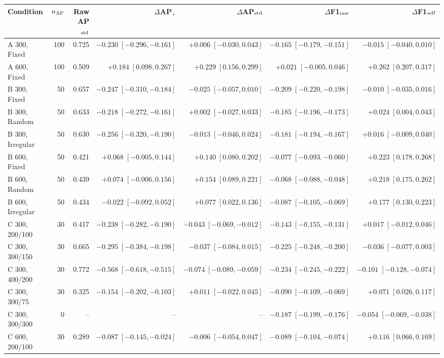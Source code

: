\begin{tabular}{lrrrrrr}
\toprule
Condition & $n_{\rm AP}$ & Raw AP$_{\rm std}$ & $\Delta$AP$_+$ & $\Delta$AP$_{\rm std}$ & $\Delta$F1$_{\rm raw}$ & $\Delta$F1$_{\rm self}$ \\
\midrule
A 300, Fixed & 100 & 0.725 & $-0.230\;[-0.296,-0.161]$ & $+0.006\;[-0.030,0.043]$ & $-0.165\;[-0.179,-0.151]$ & $-0.015\;[-0.040,0.010]$ \\
A 600, Fixed & 100 & 0.509 & $+0.184\;[0.098,0.267]$ & $+0.229\;[0.156,0.299]$ & $+0.021\;[-0.005,0.046]$ & $+0.262\;[0.207,0.317]$ \\
B 300, Fixed & 50 & 0.657 & $-0.247\;[-0.310,-0.184]$ & $-0.025\;[-0.057,0.010]$ & $-0.209\;[-0.220,-0.198]$ & $-0.010\;[-0.035,0.016]$ \\
B 300, Random & 50 & 0.633 & $-0.218\;[-0.272,-0.161]$ & $+0.002\;[-0.027,0.033]$ & $-0.185\;[-0.196,-0.173]$ & $+0.024\;[0.004,0.043]$ \\
B 300, Irregular & 50 & 0.630 & $-0.256\;[-0.320,-0.190]$ & $-0.013\;[-0.046,0.024]$ & $-0.181\;[-0.194,-0.167]$ & $+0.016\;[-0.009,0.040]$ \\
B 600, Fixed & 50 & 0.421 & $+0.068\;[-0.005,0.144]$ & $+0.140\;[0.080,0.202]$ & $-0.077\;[-0.093,-0.060]$ & $+0.223\;[0.178,0.268]$ \\
B 600, Random & 50 & 0.439 & $+0.074\;[-0.006,0.156]$ & $+0.154\;[0.089,0.221]$ & $-0.068\;[-0.088,-0.048]$ & $+0.218\;[0.175,0.262]$ \\
B 600, Irregular & 50 & 0.434 & $-0.022\;[-0.092,0.052]$ & $+0.077\;[0.022,0.136]$ & $-0.087\;[-0.105,-0.069]$ & $+0.177\;[0.130,0.223]$ \\
C 300, 200/100 & 30 & 0.417 & $-0.238\;[-0.282,-0.190]$ & $-0.043\;[-0.069,-0.012]$ & $-0.143\;[-0.155,-0.131]$ & $+0.017\;[-0.012,0.046]$ \\
C 300, 300/150 & 30 & 0.665 & $-0.295\;[-0.384,-0.198]$ & $-0.037\;[-0.084,0.015]$ & $-0.225\;[-0.248,-0.200]$ & $-0.036\;[-0.077,0.003]$ \\
C 300, 400/200 & 30 & 0.772 & $-0.568\;[-0.618,-0.515]$ & $-0.074\;[-0.089,-0.059]$ & $-0.234\;[-0.245,-0.222]$ & $-0.101\;[-0.128,-0.074]$ \\
C 300, 300/75 & 30 & 0.325 & $-0.154\;[-0.202,-0.103]$ & $+0.011\;[-0.022,0.045]$ & $-0.090\;[-0.109,-0.069]$ & $+0.071\;[0.026,0.117]$ \\
C 300, 300/300 & 0 & -- & -- & -- & $-0.187\;[-0.199,-0.176]$ & $-0.054\;[-0.069,-0.038]$ \\
C 600, 200/100 & 30 & 0.289 & $-0.087\;[-0.145,-0.024]$ & $-0.006\;[-0.054,0.047]$ & $-0.089\;[-0.104,-0.074]$ & $+0.116\;[0.066,0.169]$ \\

\end{tabular}
